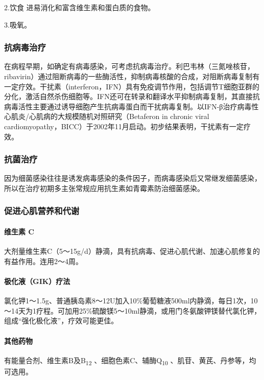 2.饮食 进易消化和富含维生素和蛋白质的食物。

3.吸氧。

\subsubsection{抗病毒治疗}

在病程早期，如确定有病毒感染，可考虑抗病毒治疗。利巴韦林（三氮唑核苷，ribavirin）通过阻断病毒的一些酶活性，抑制病毒核酸的合成，对阻断病毒复制有一定疗效。干扰素（interferon，IFN）具有免疫调节作用，包括调节T细胞亚群的分化，激活自然杀伤细胞等。IFN还可在转录和翻译水平抑制病毒复制，其直接抗病毒活性主要通过诱导细胞产生抗病毒蛋白而干扰病毒复制。以IFN-β治疗病毒性心肌炎/心肌病的大规模随机对照研究（Betaferon
in chronic viral
cardiomyopathy，BICC）于2002年11月启动。初步结果表明，干扰素有一定疗效。

\subsubsection{抗菌治疗}

因为细菌感染往往是诱发病毒感染的条件因子，而病毒感染后又常继发细菌感染，所以在治疗初期多主张常规应用抗生素如青霉素防治细菌感染。

\subsubsection{促进心肌营养和代谢}

\paragraph{维生素 C}

大剂量维生素C（5～15g/d）静滴，具有抗病毒、促进心肌代谢、加速心肌修复的有益作用。连用2～4周。

\paragraph{极化液（GIK）疗法}

氯化钾1～1.5g、普通胰岛素8～12U加入10\%葡萄糖液500ml内静滴，每日1次，10～14天为1疗程。可加用25\%硫酸镁5～10ml静滴，或用门冬氨酸钾镁替代氯化钾，组成“强化极化液”，疗效可能更佳。

\paragraph{其他药物}

有能量合剂、维生素B及B\textsubscript{12}
、细胞色素C、辅酶Q\textsubscript{10} 、肌苷、黄芪、丹参等，均可选用。

